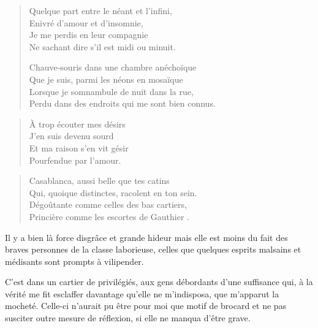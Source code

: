 \begin{verse}\quatrain
  Quelque part entre le néant et l’infini,\\ 
  Enivré d’amour et d’insomnie,\\ 
  Je me perdis en leur compagnie\\ 
  Ne sachant dire s’il est midi ou minuit.  %

  Chauve-souris dans une chambre anéchoïque\\ 
  Que je suis, parmi les néons en mosaïque\\ 
  Lorsque je somnambule de nuit dans la rue,\\ 
  Perdu dans des endroits qui me sont bien connus.  %
\end{verse}

\begin{verse}\quatrain
  À trop écouter mes désirs\\ 
  J’en suis devenu sourd\\ 
  Et ma raison s’en vit gésir\\ 
  Pourfendue par l’amour.  %
\end{verse}

\begin{verse}\quatrain
  Casablanca, aussi belle que tes catins\\ 
  Qui, quoique distinctes, racolent en ton sein.\\ 
  Dégoûtante comme celles des bas cartiers,\\ 
  Princière comme les escortes de Gauthier%
  .
\end{verse}

\begin{prose}
  Il y a bien là force disgrâce et grande hideur mais elle est moins du fait des braves personnes de la classe laborieuse, celles que quelques esprits malsains et médisants sont prompts à vilipender.

  C’est dans un cartier de privilégiés, aux gens débordants d’une suffisance qui, à la vérité me fit esclaffer davantage qu’elle ne m’indisposa, que m’apparut la mocheté. Celle-ci n’aurait pu être pour moi que motif de brocard et ne pas susciter outre mesure de réflexion, si elle ne manqua d’être grave.
\end{prose}

